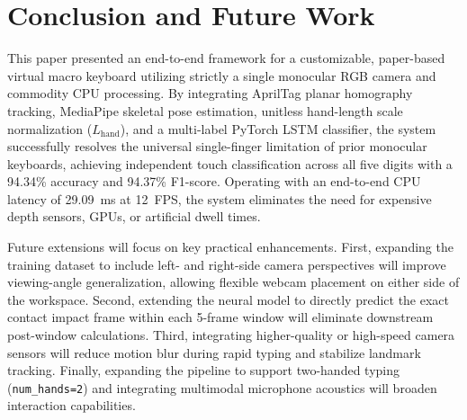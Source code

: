 \documentclass[conference]{IEEEtran}
\begin{document}
\section{Conclusion and Future Work}
\label{sec:conclusion}
This paper presented an end-to-end framework for a customizable, paper-based virtual macro keyboard utilizing strictly a single monocular RGB camera and commodity CPU processing. By integrating AprilTag planar homography tracking, MediaPipe skeletal pose estimation, unitless hand-length scale normalization ($L_{\text{hand}}$), and a multi-label PyTorch LSTM classifier, the system successfully resolves the universal single-finger limitation of prior monocular keyboards, achieving independent touch classification across all five digits with a 94.34\% accuracy and 94.37\% F1-score. Operating with an end-to-end CPU latency of 29.09~ms at 12~FPS, the system eliminates the need for expensive depth sensors, GPUs, or artificial dwell times.

Future extensions will focus on key practical enhancements. First, expanding the training dataset to include left- and right-side camera perspectives will improve viewing-angle generalization, allowing flexible webcam placement on either side of the workspace. Second, extending the neural model to directly predict the exact contact impact frame within each 5-frame window will eliminate downstream post-window calculations. Third, integrating higher-quality or high-speed camera sensors will reduce motion blur during rapid typing and stabilize landmark tracking. Finally, expanding the pipeline to support two-handed typing (\texttt{num\_hands=2}) and integrating multimodal microphone acoustics will broaden interaction capabilities.



\end{document}
